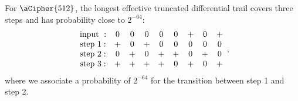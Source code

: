 For $\aCipher{512}$, the longest effective truncated differential trail covers three steps and has probability close to $2^{-64}$: 
$$
\begin{array}{ccccccccc}
\text{input } : & 0 & 0 & 0 & 0 & 0 & + & 0 & +\\
\text{step } 1: & + & 0 & + & 0 & 0 & 0 & 0 & 0\\
\text{step } 2: & 0 & + & 0 & + & + & 0 & + & 0\\
\text{step } 3: & + & + & + & + & 0 & + & 0 & +\\
\end{array},
$$
where we associate a probability of $2^{-64}$ for the transition between step 1 and step 2. 

